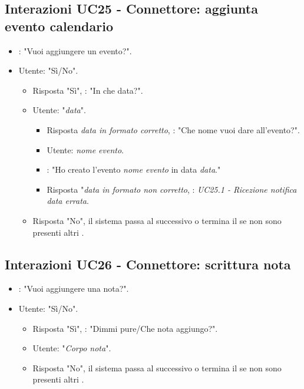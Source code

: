 \subsection{Interazioni UC25 - Connettore: aggiunta evento calendario}
\label{sec:connettore_evento_calendario}
 \begin{itemize}
        \item {}: "Vuoi aggiungere un evento?".
        \item Utente: "Sì/No".
        \begin{itemize}
         \item{Risposta "Sì"}, : "In che data?".
         \item Utente: "{\it data}".
         \begin{itemize}
             \item{Risposta {\it data in formato corretto}}, : "Che nome vuoi dare all'evento?".
             \item Utente: {\it nome evento}.
             \item {}: "Ho creato l'evento {\it nome evento} in data {\it data}."
            \item{Risposta "{\it data in formato non corretto}}, : {\it UC25.1 - Ricezione notifica data errata}.
         \end{itemize}
         \item{Risposta "No"}, il sistema passa al  successivo o termina il  se non sono presenti altri .
         \end{itemize}
    \end{itemize}

\subsection{Interazioni UC26 - Connettore: scrittura nota}
\label{sec:connettore_nota}
\begin{itemize}
        \item {}: "Vuoi aggiungere una nota?".
        \item Utente: "Sì/No".
        \begin{itemize}
         \item{Risposta "Sì"}, : "Dimmi pure/Che nota aggiungo?".
         \item Utente: "{\it Corpo nota}".
         \item{Risposta "No"}, il sistema passa al  successivo o termina il  se non sono presenti altri .
         \end{itemize}
    \end{itemize}


